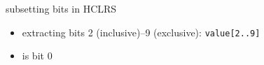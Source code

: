 \begin{frame}{subsetting bits in HCLRS}
    \begin{itemize}
    \item extracting bits 2 (inclusive)--9 (exclusive): {\tt value[2..9]}
    \item {} is bit 0
    \end{itemize}
\end{frame}

